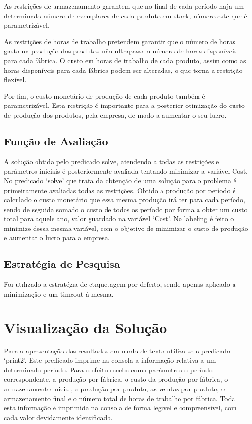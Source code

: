\documentclass[runningheads,a4paper]{llncs}
\begin{document}
As restrições de armazenamento garantem que no final de cada período haja um determinado número de exemplares de cada produto em stock, número este que é parametrizável. 

As restrições de horas de trabalho pretendem garantir que o número de horas gasto na produção dos produtos não ultrapasse o número de horas disponíveis para cada fábrica. O custo em horas de trabalho de cada produto, assim como as horas disponíveis para cada fábrica podem ser alteradas, o que torna a restrição flexível. 

Por fim, o custo monetário de produção de cada produto também é parametrizável. Esta restrição é importante para a posterior otimização do custo de produção dos produtos, pela empresa, de modo a aumentar o seu lucro. 

\subsection{Função de Avaliação}

A solução obtida pelo predicado solve, atendendo a todas as restrições e parámetros iniciais é posteriormente avaliada tentando minimizar a variável Cost.  No predicado `solve' que trata da obtenção de uma solução para o problema é primeiramente avaliadas todas as restrições. Obtido a produção por período é calculado o custo monetário que essa mesma produção irá ter para cada período, sendo de seguida somado o custo de todos os período por forma a obter um custo total para aquele ano, valor guardado na variável `Cost'. No labeling é feito o minimize dessa mesma variável, com o objetivo de minimizar o custo de produção e aumentar o lucro para a empresa. 

\subsection{Estratégia de Pesquisa}

Foi utilizado a estratégia de etiquetagem por defeito, sendo apenas aplicado a minimização e um timeout à mesma.


\section{Visualização da Solução}

Para a apresentação dos resultados em modo de texto utiliza-se o predicado `print2'. Este predicado imprime na consola a informação relativa a um determinado período. Para o efeito recebe como parâmetros o período correspondente, a produção por fábrica, o custo da produção por fábrica, o armazenamento inicial, a produção por produto, as vendas por produto, o armazenamento final e o número total de horas de trabalho por fábrica. Toda esta informação é imprimida na consola de forma legível e compreensível, com cada valor devidamente identificado. 
\end{document}
